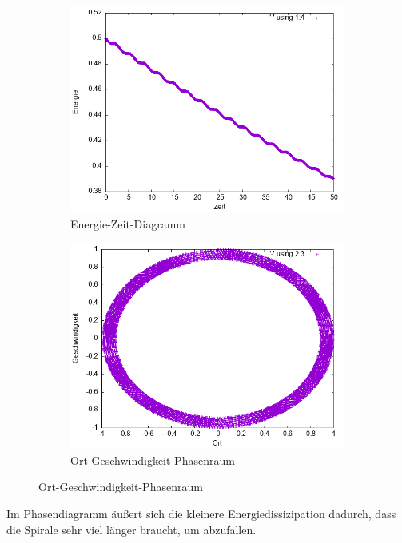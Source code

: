 \documentclass[
    oneside,
    ngerman,
    footinclude=false,
    captions=tableheading,
    DIV=12
]{scrartcl}
\begin{document}
            \begin{figure}[H]
            \centering
            \begin{subfigure}[b]{0.45\textwidth}
                \centering
                \includegraphics[width=\textwidth]{Bilddateien/LLA1(a)-001-E.png}
                \caption{Energie-Zeit-Diagramm}
                \label{fig:LLA1(a)-001-0-E}
            \end{subfigure}
            \hfill
            \begin{subfigure}[b]{0.45\textwidth}
                \centering
                \includegraphics[width=\textwidth]{Bilddateien/LLA1(a)-001-0-xv.png}
                \caption{Ort-Geschwindigkeit-Phasenraum}
                \label{fig:LLA1(a)-001-0-xv}
            \end{subfigure}
            \end{figure}
            Im Phasendiagramm äußert sich die kleinere Energiedissizipation dadurch, dass die Spirale sehr viel länger braucht, um abzufallen.
            \newpage
\end{document}
